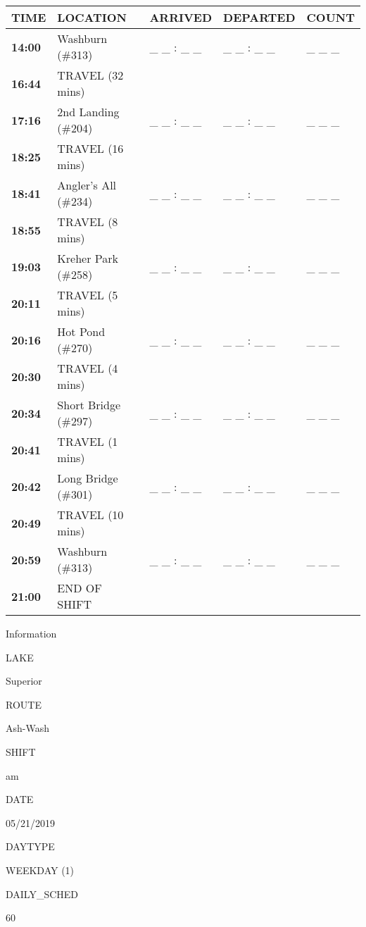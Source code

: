 \documentclass[]{article}
\begin{document}
\begin{tabular}{>{\bfseries}lllll}
\toprule
\textbf{TIME} & \textbf{LOCATION} & \textbf{ARRIVED} & \textbf{DEPARTED} & \textbf{COUNT}\\
\midrule
14:00 & Washburn (\#313) & \_ \_ : \_ \_ & \_ \_ : \_ \_ & \_ \_ \_\\
16:44 & TRAVEL (32 mins) &  &  & \\
17:16 & 2nd Landing (\#204) & \_ \_ : \_ \_ & \_ \_ : \_ \_ & \_ \_ \_\\
18:25 & TRAVEL (16 mins) &  &  & \\
18:41 & Angler's All (\#234) & \_ \_ : \_ \_ & \_ \_ : \_ \_ & \_ \_ \_\\
18:55 & TRAVEL (8 mins) &  &  & \\
19:03 & Kreher Park (\#258) & \_ \_ : \_ \_ & \_ \_ : \_ \_ & \_ \_ \_\\
20:11 & TRAVEL (5 mins) &  &  & \\
20:16 & Hot Pond (\#270) & \_ \_ : \_ \_ & \_ \_ : \_ \_ & \_ \_ \_\\
20:30 & TRAVEL (4 mins) &  &  & \\
20:34 & Short Bridge (\#297) & \_ \_ : \_ \_ & \_ \_ : \_ \_ & \_ \_ \_\\
20:41 & TRAVEL (1 mins) &  &  & \\
20:42 & Long Bridge (\#301) & \_ \_ : \_ \_ & \_ \_ : \_ \_ & \_ \_ \_\\
20:49 & TRAVEL (10 mins) &  &  & \\
20:59 & Washburn (\#313) & \_ \_ : \_ \_ & \_ \_ : \_ \_ & \_ \_ \_\\
21:00 & END OF SHIFT &  &  & \\
\bottomrule
\end{tabular}\newpage

Information

LAKE

Superior

ROUTE

Ash-Wash

SHIFT

am

DATE

05/21/2019

DAYTYPE

WEEKDAY (1)

DAILY\_SCHED

60

\vspace{24pt}
\end{document}
